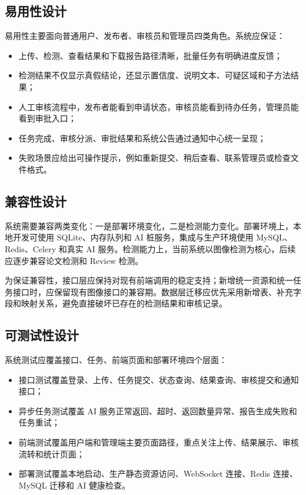 \subsection{易用性设计}
易用性主要面向普通用户、发布者、审核员和管理员四类角色。系统应保证：
\begin{itemize}[leftmargin=2em]
    \item 上传、检测、查看结果和下载报告路径清晰，批量任务有明确进度反馈；
    \item 检测结果不仅显示真假结论，还显示置信度、说明文本、可疑区域和子方法结果；
    \item 人工审核流程中，发布者能看到申请状态，审核员能看到待办任务，管理员能看到审批入口；
    \item 任务完成、审核分派、审批结果和系统公告通过通知中心统一呈现；
    \item 失败场景应给出可操作提示，例如重新提交、稍后查看、联系管理员或检查文件格式。
\end{itemize}

\subsection{兼容性设计}
系统需要兼容两类变化：一是部署环境变化，二是检测能力变化。部署环境上，本地开发可使用 SQLite、内存队列和 AI 桩服务，集成与生产环境使用 MySQL、Redis、Celery 和真实 AI 服务。检测能力上，当前系统以图像检测为核心，后续应逐步兼容论文检测和 Review 检测。

为保证兼容性，接口层应保持对现有前端调用的稳定支持；新增统一资源和统一任务接口时，应保留现有图像接口的兼容期。数据层迁移应优先采用新增表、补充字段和映射关系，避免直接破坏已存在的检测结果和审核记录。

\subsection{可测试性设计}
系统测试应覆盖接口、任务、前端页面和部署环境四个层面：
\begin{itemize}[leftmargin=2em]
    \item 接口测试覆盖登录、上传、任务提交、状态查询、结果查询、审核提交和通知接口；
    \item 异步任务测试覆盖 AI 服务正常返回、超时、返回数量异常、报告生成失败和任务重试；
    \item 前端测试覆盖用户端和管理端主要页面路径，重点关注上传、结果展示、审核流转和统计页面；
    \item 部署测试覆盖本地启动、生产静态资源访问、WebSocket 连接、Redis 连接、MySQL 迁移和 AI 健康检查。
\end{itemize}

